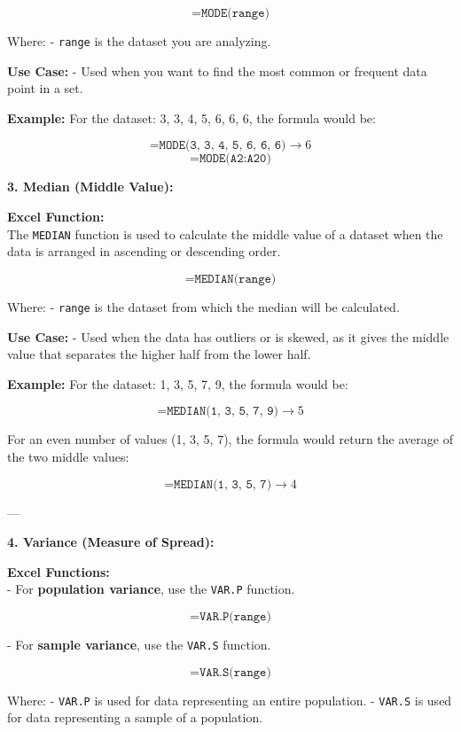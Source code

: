 \documentclass[12pt,a4paper]{book}
\begin{document}
\[
\texttt{=MODE(range)}
\]

Where:
- \texttt{range} is the dataset you are analyzing.

\textbf{Use Case:}
- Used when you want to find the most common or frequent data point in a set.

\textbf{Example:}
For the dataset: 3, 3, 4, 5, 6, 6, 6, the formula would be:

\[
\texttt{=MODE(3, 3, 4, 5, 6, 6, 6)} \rightarrow 6
\]
\[
\texttt{=MODE(A2:A20)}
\]


\textbf{3. Median (Middle Value):}

\vspace{0.5cm}

\textbf{Excel Function:} \\
The \texttt{MEDIAN} function is used to calculate the middle value of a dataset when the data is arranged in ascending or descending order.

\[
\texttt{=MEDIAN(range)}
\]

Where:
- \texttt{range} is the dataset from which the median will be calculated.

\textbf{Use Case:}
- Used when the data has outliers or is skewed, as it gives the middle value that separates the higher half from the lower half.

\textbf{Example:}
For the dataset: 1, 3, 5, 7, 9, the formula would be:

\[
\texttt{=MEDIAN(1, 3, 5, 7, 9)} \rightarrow 5
\]

For an even number of values (1, 3, 5, 7), the formula would return the average of the two middle values:

\[
\texttt{=MEDIAN(1, 3, 5, 7)} \rightarrow 4
\]

---

\textbf{4. Variance (Measure of Spread):}

\vspace{0.5cm}

\textbf{Excel Functions:} \\
- For \textbf{population variance}, use the \texttt{VAR.P} function.
  
\[
\texttt{=VAR.P(range)}
\]

- For \textbf{sample variance}, use the \texttt{VAR.S} function.

\[
\texttt{=VAR.S(range)}
\]

Where:
- \texttt{VAR.P} is used for data representing an entire population.
- \texttt{VAR.S} is used for data representing a sample of a population.
\end{document}
